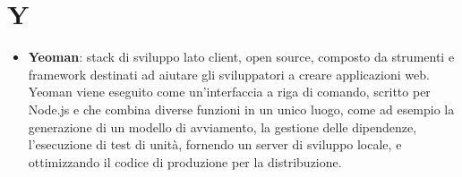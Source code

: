 \section{Y}
	\begin{itemize}
		\item\textbf{Yeoman}: stack di sviluppo lato client, open source, composto da strumenti e framework destinati ad aiutare gli sviluppatori a creare applicazioni web. Yeoman viene eseguito come un'interfaccia a riga di comando, scritto per Node.js e che combina diverse funzioni in un unico luogo, come ad esempio la generazione di un modello di avviamento, la gestione delle dipendenze, l'esecuzione di test di unità, fornendo un server di sviluppo locale, e ottimizzando il codice di produzione per la distribuzione.
	\end{itemize}